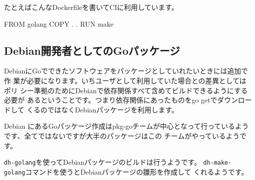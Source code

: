 \documentclass[mingoth,a4paper]{jsarticle}
\begin{document}
たとえばこんなDockerfileを書いてCIに利用しています。

\begin{commandline}
FROM golang
COPY . .
RUN make
\end{commandline}


\subsection{Debian開発者としてのGoパッケージ}

DebianにGoでできたソフトウェアをパッケージとしていれたいときには追加で作
業が必要になります。いちユーザとして利用していた場合との差異としてはポリ
シー準拠のためにDebianで依存関係すべて含めてビルドできるようにする必要が
あるということです。つまり依存関係にあったものをgo getでダウンロードして
くるのではなくDebianパッケージを利用します。

Debian にあるGoパッケージ作成はpkg-goチームが中心となって行っているよう
です\cite{debian-go-packaging}、全てではないですが大半のパッケージはこの
チームがやっているようです。

\texttt{dh-golang}を使ってDebianパッケージのビルドは行うようです。
\texttt{dh-make-golang}コマンドを使うとDebianパッケージの雛形を作成して
くれるようです。
\end{document}
